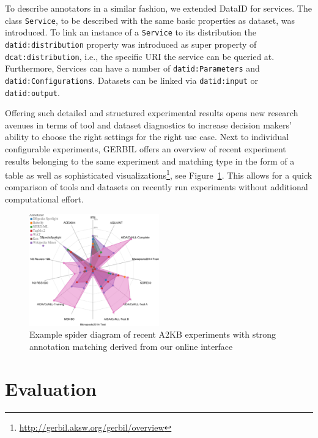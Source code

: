 To describe annotators in a similar fashion, we extended DataID for services. 
The class \texttt{Service}, to be described with the same basic properties as dataset, was introduced. 
To link an instance of a \texttt{Service} to its distribution the \texttt{datid:distribution} property was introduced as super property of \texttt{dcat:distribution}, i.e., the specific URI the service can be queried at.
Furthermore, Services can have a number of \texttt{datid:Parameters} and \texttt{datid:Configurations}.
Datasets can be linked via \texttt{datid:input} or \texttt{datid:output}. 

Offering such detailed and structured experimental results opens new research avenues in terms of tool and dataset diagnostics to increase decision makers' ability to choose the right settings for the right use case.
Next to individual configurable experiments, GERBIL offers an overview of recent experiment results belonging to the same experiment and matching type in the form of a table as well as sophisticated visualizations\footnote{\url{http://gerbil.aksw.org/gerbil/overview}}, see Figure~\ref{fig:spider}.
This allows for a quick comparison of tools and datasets on recently run experiments without additional computational effort.

\begin{figure}[htb]
\centering
\includegraphics[width=0.5\textwidth]{chapter_three/benchmarking/WWW_GERBIL/spider}
\caption{Example spider diagram of recent A2KB experiments with strong annotation matching derived from our online interface}
\label{fig:spider}
\end{figure}



\section{Evaluation}
\label{cha332:sec:eval}

